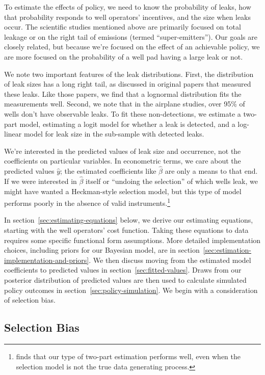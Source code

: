 \documentclass[12pt,oneside,letterpaper]{article}
\theoremstyle{definition}
\begin{document}
\begin{refsection}
To estimate the effects of policy, we need to know the probability of leaks, how that probability responds to well operators' incentives, and the size when leaks occur.
The scientific studies mentioned above are primarily focused on total leakage or on the  right tail of emissions (termed ``super-emitters'').
Our goals are closely related, but because we're focused on the effect of an achievable policy, we are more focused on the probability of a well pad having a large leak or not.


We note two important features of the leak distributions.
First, the distribution of leak sizes has a long right tail,
as discussed in original papers that measured these leaks.
Like those papers, we find that a lognormal distribution fits the measurements well.
Second, we note that in the airplane studies, over 95\% of wells don't have observable leaks.
To fit these non-detections, we estimate a two-part model, estimating a logit model for whether a leak is detected, and a log-linear model for leak size in the sub-sample with detected leaks.

We're interested in the predicted values of leak size and occurrence, not the coefficients on particular variables.
In econometric terms, we care about the predicted values \(\hat{y}\); the estimated coefficients like \(\hat{\beta}\) are only a means to that end.
If we were interested in \(\hat{\beta}\) itself or ``undoing the selection'' of which wells leak, we might have wanted a Heckman-style selection model, but this type of model performs poorly in the absence of valid instruments.\footnote{%
\textcite{Manning/Duan/Rogers:1987} finds that our type of two-part estimation performs well, even when the selection model is not the true data generating process.
}


In section~\ref{sec:estimating-equations} below, we derive our estimating equations, starting with the well operators' cost function.
Taking these equations to data requires some specific functional form assumptions.
More detailed implementation choices, including priors for our Bayesian model, are in section~\ref{sec:estimation-implementation-and-priors}.
We then discuss moving from the estimated model coefficients to predicted values in section~\ref{sec:fitted-values}.
Draws from our posterior distribution of predicted values are then used to calculate simulated policy outcomes in section~\ref{sec:policy-simulation}.
We begin with a consideration of selection bias.



\subsection{Selection Bias}
\label{sec:selection-bias}


\end{refsection}
\end{document}

